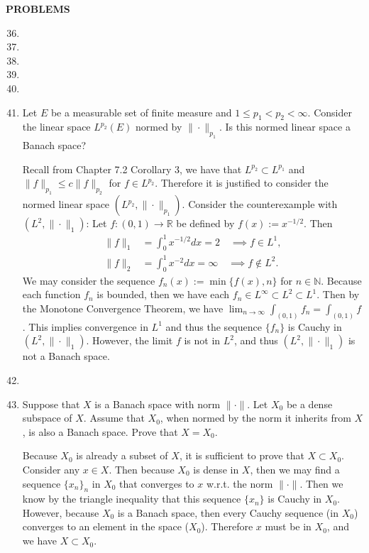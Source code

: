\begin{center}
	\textbf{PROBLEMS}
\end{center}
\begin{enumerate}
	\setcounter{enumi}{35}
	\item
	\item
	\item
	\item
	\item
	\item Let $E$ be a measurable set of finite measure and $1\le p_1<p_2<\infty$.
	Consider the linear space $L^{p_2}(E)$ normed by $\|\cdot\|_{p_1}$.
	Is this normed linear space a Banach space?
	
	Recall from Chapter 7.2 Corollary 3, we have that $L^{p_2}\subset L^{p_1}$ and $\|f\|_{p_1}\le c\|f\|_{p_2}$ for $f\in L^{p_2}$.
	Therefore it is justified to consider the normed linear space $(L^{p_2},\|\cdot\|_{p_1})$.
	Consider the counterexample with $(L^2,\|\cdot\|_1)$:
	Let $f:(0,1)\to\mathbb{R}$ be defined by $f(x):=x^{-1/2}$.
	Then 
	\begin{align*}
		\|f\|_1&=\int_0^1x^{-1/2}dx=2\quad\implies f\in L^1,\\
		\|f\|_2&=\int_0^1x^{-2}dx=\infty\quad\implies f\notin L^2.
	\end{align*}
	We may consider the sequence $f_n(x):=\min\{f(x),n\}$ for $n\in\mathbb{N}$.
	Because each function $f_n$ is bounded, then we have each $f_n\in L^\infty\subset L^2\subset L^1$.
	Then by the Monotone Convergence Theorem, we have $\lim_{n\to\infty}\int_{(0,1)}f_n=\int_{(0,1)}f$.
	This implies convergence in $L^1$ and thus the sequence $\{f_n\}$ is Cauchy in $(L^2,\|\cdot\|_1)$.
	However, the limit $f$ is not in $L^2$, and thus $(L^2,\|\cdot\|_1)$ is not a Banach space.

	\item
	\item Suppose that $X$ is a Banach space with norm $\|\cdot\|$.
	Let $X_0$ be a dense subspace of $X$.
	Assume that $X_0$, when normed by the norm it inherits from $X$, is also a Banach space.
	Prove that $X=X_0$.

	Because $X_0$ is already a subset of $X$, it is sufficient to prove that $X\subset X_0$.
	Consider any $x\in X$.
	Then because $X_0$ is dense in $X$, then we may find a sequence $\{x_n\}_n$ in $X_0$ that converges to $x$ w.r.t. the norm $\|\cdot\|$.
	Then we know by the triangle inequality that this sequence $\{x_n\}$ is Cauchy in $X_0$.
	However, because $X_0$ is a Banach space, then every Cauchy sequence (in $X_0$) converges to an element in the space ($X_0$).
	Therefore $x$ must be in $X_0$, and we have $X\subset X_0$.
\end{enumerate}
